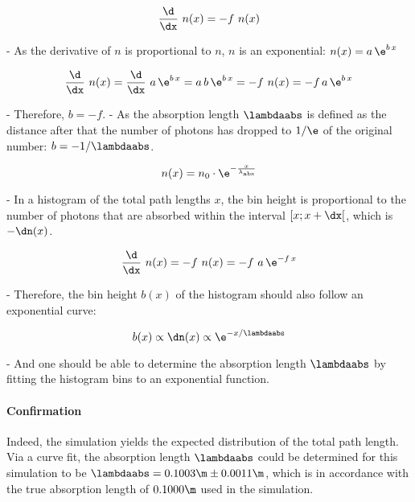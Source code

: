 $$ \frac{\d}{\dx}\ n(x) = -f\ n(x) $$

- As the derivative of $n$ is proportional to $n$, $n$ is an exponential: $n(x) = a\,\e^{b\,x}$

$$ \frac{\d}{\dx}\ n(x)
  = \frac{\d}{\dx}\ a\,\e^{b\,x}
  = a\,b\,\e^{b\,x}
  = -f\ n(x)
  = -f\,a\,\e^{b\,x} $$

- Therefore, $b = -f$.
- As the absorption length $\lambdaabs$ is defined as the distance after that the number of photons has dropped to $1/\e$ of the original number: $b = -1/\lambdaabs$.


$$
  n(x) = n_0 \cdot \e^{-\frac{x}{\lambda_\text{abs}}}
$$

%

- In a histogram of the total path lengths $x$, the bin height is proportional to the number of photons that are absorbed within the interval $[x; x + \dx[$, which is $-\dn(x)$.

$$ \frac{\d}{\dx}\ n(x) = -f\ n(x)
  = -f\ a\,\e^{-f\,x} $$

- Therefore, the bin height $b(x)$ of the histogram should also follow an exponential curve:

$$ b(x) \propto \dn(x) \propto \e^{-x/\lambdaabs} $$

- And one should be able to determine the absorption length $\lambdaabs$ by fitting the histogram bins to an exponential function.

\paragraph{Confirmation} Indeed, the simulation yields the expected distribution of the total path length. Via a curve fit, the absorption length $\lambdaabs$ could be determined for this simulation to be $\lambdaabs = 0.1003\m \pm 0.0011\m$, which is in accordance with the true absorption length of $0.1000\m$ used in the simulation.


